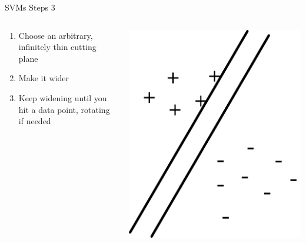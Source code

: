 \documentclass[aspectratio=169]{beamer}
\begin{document}
\begin{frame}{SVMs Steps 3}

\begin{columns}[T]
\begin{column}{0.6\textwidth}
\begin{enumerate}
\item  Choose an arbitrary, infinitely thin cutting plane
\item Make it wider
\item Keep widening until you hit a data point, rotating if needed
\end{enumerate}
\end{column}
\begin{column}{0.4\textwidth}
\includegraphics[width=1\textwidth]{lectSVM/svm4}
\end{column}
\end{columns}
\end{frame}
\end{document}
